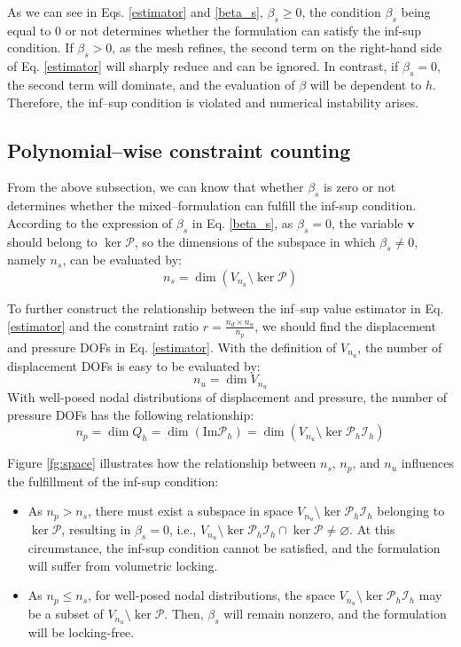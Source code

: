 As we can see in Eqs. \eqref{estimator} and \eqref{beta_s}, $\beta_s \ge 0$, the condition $\beta_s$ being equal to $0$ or not determines whether the formulation can satisfy the inf-sup condition. If $\beta_s > 0$, as the mesh refines, the second term on the right-hand side of Eq. \eqref{estimator} will sharply reduce and can be ignored. In contrast, if $\beta_s = 0$, the second term will dominate, and the evaluation of $\beta$ will be dependent to $h$.
Therefore, the inf--sup condition is violated and numerical instability arises.

\subsection{Polynomial--wise constraint counting}

From the above subsection, we can know that whether $\beta_s$ is zero or not determines whether the mixed--formulation can fulfill the inf-sup condition. According to the expression of $\beta_s$ in Eq. \eqref{beta_s}, as $\beta_s = 0$, the variable $\boldsymbol{v}$ should belong to $\ker \mathcal{P}$, so the dimensions of the subspace in which $\beta_s \ne 0$, namely $n_s$, can be evaluated by:
\begin{equation}
n_s = \dim(V_{n_u} \setminus \ker \mathcal{P})
\end{equation}

To further construct the relationship between the inf--sup value estimator in Eq. \eqref{estimator} and the constraint ratio $r = \frac{n_d \times n_u}{n_p}$, we should find the displacement and pressure DOFs in Eq. \eqref{estimator}. With the definition of $V_{n_u}$, the number of displacement DOFs is easy to be evaluated by:
\begin{equation}
n_u = \dim V_{n_u}
\end{equation}
With well-posed nodal distributions of displacement and pressure, the number of pressure DOFs has the following relationship:
\begin{equation}
n_p = \dim Q_h = \dim (\mathrm{Im} \mathcal{P}_h) = \dim (V_{n_u} \setminus \ker \mathcal{P}_h \mathcal{I}_h)
\end{equation}

Figure \ref{fg:space} illustrates how the relationship between $n_s$, $n_p$, and $n_u$ influences the fulfillment of the inf-sup condition:
\begin{itemize}
\item As $n_p > n_s$, there must exist a subspace in space $V_{n_u} \setminus \ker \mathcal{P}_h \mathcal{I}_h$ belonging to $\ker \mathcal{P}$, resulting in $\beta_s = 0$, i.e., $V_{n_u} \setminus \ker \mathcal{P}_h \mathcal{I}_h \cap \ker \mathcal{P} \neq \varnothing$. At this circumstance, the inf-sup condition cannot be satisfied, and the formulation will suffer from volumetric locking.

\item As $n_p \le n_s$, for well-posed nodal distributions, the space $V_{n_u} \setminus \ker \mathcal{P}_h \mathcal{I}_h$ may be a subset of $V_{n_u} \setminus \ker \mathcal{P}$. Then, $\beta_s$ will remain nonzero, and the formulation will be locking-free.
\end{itemize}


